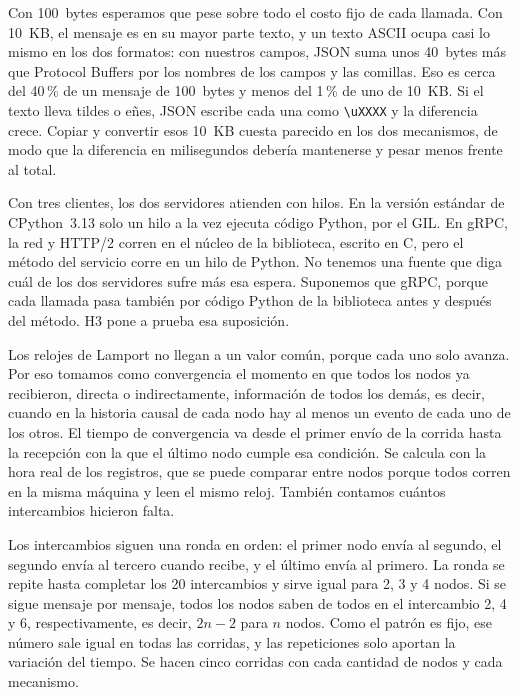 Con 100~bytes esperamos que pese sobre todo el costo fijo de cada llamada. Con 10~KB, el mensaje es en su mayor parte texto, y un texto ASCII ocupa casi lo mismo en los dos formatos: con nuestros campos, JSON suma unos 40~bytes más que Protocol Buffers por los nombres de los campos y las comillas. Eso es cerca del 40\,\% de un mensaje de 100~bytes y menos del 1\,\% de uno de 10~KB. Si el texto lleva tildes o eñes, JSON escribe cada una como \texttt{\textbackslash uXXXX} y la diferencia crece. Copiar y convertir esos 10~KB cuesta parecido en los dos mecanismos, de modo que la diferencia en milisegundos debería mantenerse y pesar menos frente al total.

Con tres clientes, los dos servidores atienden con hilos. En la versión estándar de CPython~3.13 solo un hilo a la vez ejecuta código Python, por el GIL. En gRPC, la red y HTTP/2 corren en el núcleo de la biblioteca, escrito en C, pero el método del servicio corre en un hilo de Python. No tenemos una fuente que diga cuál de los dos servidores sufre más esa espera. Suponemos que gRPC, porque cada llamada pasa también por código Python de la biblioteca antes y después del método. H3 pone a prueba esa suposición.

Los relojes de Lamport no llegan a un valor común, porque cada uno solo avanza. Por eso tomamos como convergencia el momento en que todos los nodos ya recibieron, directa o indirectamente, información de todos los demás, es decir, cuando en la historia causal de cada nodo hay al menos un evento de cada uno de los otros. El tiempo de convergencia va desde el primer envío de la corrida hasta la recepción con la que el último nodo cumple esa condición. Se calcula con la hora real de los registros, que se puede comparar entre nodos porque todos corren en la misma máquina y leen el mismo reloj. También contamos cuántos intercambios hicieron falta.

Los intercambios siguen una ronda en orden: el primer nodo envía al segundo, el segundo envía al tercero cuando recibe, y el último envía al primero. La ronda se repite hasta completar los 20 intercambios y sirve igual para 2, 3 y 4 nodos. Si se sigue mensaje por mensaje, todos los nodos saben de todos en el intercambio 2, 4 y 6, respectivamente, es decir, $2n-2$ para $n$ nodos. Como el patrón es fijo, ese número sale igual en todas las corridas, y las repeticiones solo aportan la variación del tiempo. Se hacen cinco corridas con cada cantidad de nodos y cada mecanismo.

